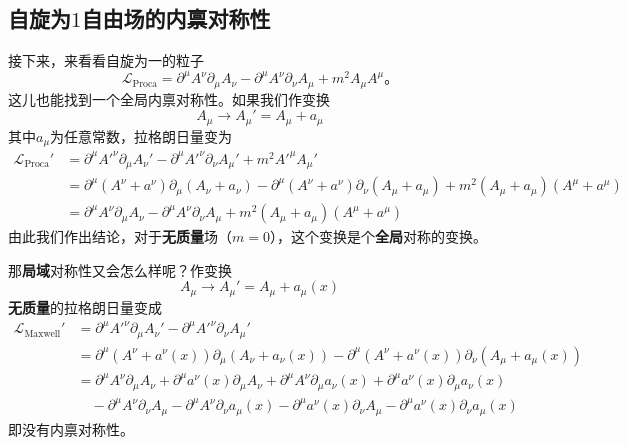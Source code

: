 \subsection{自旋为$1$自由场的内禀对称性}\label{sec7.1.2}
接下来，来看看自旋为一的粒子
\begin{equation}
\label{equ7.6}
{\mathscr L}_\text{Proca} = \partial^\mu A^\nu\partial_\mu A_\nu - \partial^\mu A^\nu \partial_\nu A_\mu + m^2A_\mu A^\mu \text{。}
\end{equation}
这儿也能找到一个全局内禀对称性。如果我们作变换
\begin{equation}
\label{equ7.7}
A_\mu \rightarrow A_\mu' = A_\mu+a_\mu
\end{equation}
其中$a_\mu$为任意常数，拉格朗日量变为
\begin{align}
{\mathscr L}_\text{Proca}' &= \partial^\mu A'^\nu\partial_\mu A_\nu' - \partial^\mu A'^\nu \partial_\nu A_\mu' + m^2A'^\mu A_\mu' \nonumber\\
&= \partial^\mu (A^\nu+a^\nu)\partial_\mu (A_\nu+a_\nu) - \partial^\mu (A^\nu+a^\nu) \partial_\nu ( A_\mu+a_\mu) + m^2( A_\mu+a_\mu) ( A^\mu+a^\mu) \nonumber\\
\label{equ7.8}
&= \partial^\mu A^\nu\partial_\mu A_\nu - \partial^\mu A^\nu \partial_\nu A_\mu + m^2( A_\mu+a_\mu) ( A^\mu+a^\mu)
\end{align}
由此我们作出结论，对于{\bf 无质量}场（$m=0$），这个变换是个{\bf 全局}对称的变换。

那{\bf 局域}对称性又会怎么样呢？作变换
\begin{equation}
\label{equ7.9}
A_\mu \rightarrow A_\mu' = A_\mu+a_\mu(x)
\end{equation}
{\bf 无质量}的拉格朗日量变成
\begin{align}
{\mathscr L}_\text{Maxwell}' &= \partial^\mu A'^\nu \partial_\mu A_\nu' - \partial^\mu A'^\nu \partial_\nu A_\mu' \nonumber\\
&= \partial^\mu (A^\nu+a^\nu(x))\partial_\mu (A_\nu+a_\nu(x)) - \partial^\mu (A^\nu+a^\nu(x)) \partial_\nu ( A_\mu+a_\mu(x))  \nonumber\\
&= \partial^\mu A^\nu\partial_\mu A_\nu+\partial^\mu a^\nu(x)\partial_\mu A_\nu+\partial^\mu A^\nu\partial_\mu a_\nu(x) +\partial^\mu a^\nu(x)\partial_\mu a_\nu(x) \nonumber\\
\label{equ7.10}
& \quad - \partial^\mu A^\nu \partial_\nu A_\mu - \partial^\mu A^\nu \partial_\nu a_\mu(x)-\partial^\mu a^\nu(x) \partial_\nu A_\mu - \partial^\mu a^\nu(x) \partial_\nu a_\mu(x)
\end{align}
即没有内禀对称性。

